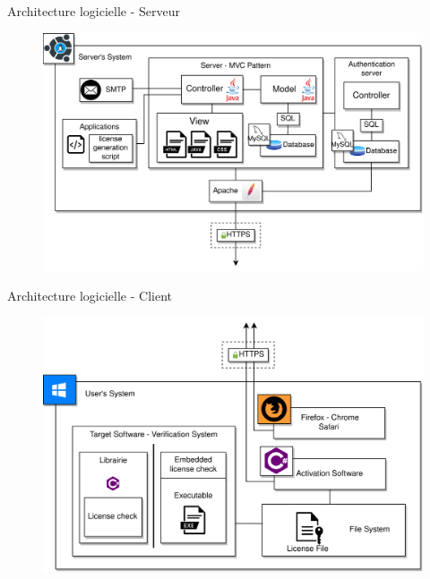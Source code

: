 \documentclass{cubeamer}
\begin{document}
\begin{frame}{Architecture logicielle - Serveur}
    \begin{figure}
        \centering
        \includegraphics[scale=0.7]{img/DAT-server.png}
    \end{figure}
\end{frame}

\begin{frame}{Architecture logicielle - Client}
    \begin{figure}
        \centering
        \vspace{-0.8cm}
        \includegraphics[scale=0.72]{img/DAT-client.png}
    \end{figure}
\end{frame}
\end{document}
